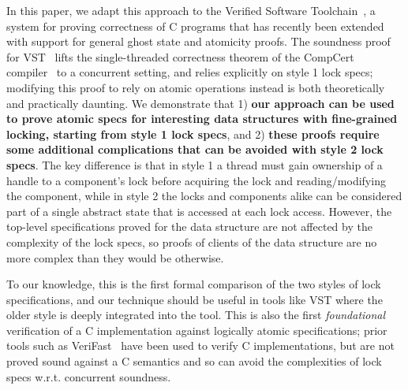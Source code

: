 In this paper, we adapt this  approach to the Verified Software Toolchain~\cite{plfcc}, a system for proving correctness of C programs that has recently been extended with support for general ghost state and atomicity proofs. The soundness proof for VST~\cite{cpm} lifts the single-threaded correctness theorem of the CompCert compiler~\cite{compcert} to a concurrent setting, and relies explicitly on style 1 lock specs; modifying this proof to rely on atomic operations instead is both theoretically and practically daunting. We demonstrate that 1) \textbf{our approach can be used to prove atomic specs for interesting data structures with fine-grained locking, starting from style 1 lock specs}, and 2) \textbf{these proofs require some additional complications that can be avoided with style 2 lock specs}. The key difference is that in style 1 a thread must gain ownership of a handle to a component's lock before acquiring the lock and reading/modifying the component, while in style 2 the locks and components alike can be considered part of a single abstract state that is accessed at each lock access. However, the top-level specifications proved for the data structure are not affected by the complexity of the lock specs, so proofs of clients of the data structure are no more complex than they would be otherwise.

To our knowledge, this is the first formal comparison of the two styles of lock specifications, and our technique should be useful in tools like VST where the older style is deeply integrated into the tool. This is also the first \emph{foundational} verification of a C implementation against logically atomic specifications; prior tools such as VeriFast~\cite{verifast-conc} have been used to verify C implementations, but are not proved sound against a C semantics and so can avoid the complexities of lock specs w.r.t. concurrent soundness.

